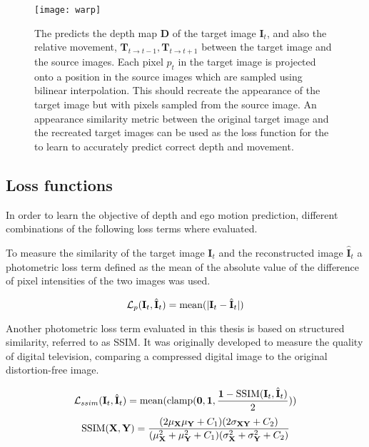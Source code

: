 \begin{figure}[H]
	\centering
	\texttt{[image: warp]}
	\caption{The \abbrCNN predicts the depth map $\textbf{D}$ of the target image $\textbf{I}_t$, and also the relative movement, $\textbf{T}_{t\rightarrow t-1}, \textbf{T}_{t\rightarrow t+1}$ between the target image and the source images. Each pixel $p_t$ in the target image is projected onto a position in the source images which are sampled using bilinear interpolation. This should recreate the appearance of the target image but with pixels sampled from the source image. An appearance similarity metric between the original target image and the recreated target images can be used as the loss function for the \abbrCNN to learn to accurately predict correct depth and movement.}
	\label{fig:warp}
\end{figure}



\subsection{Loss functions}
\label{sec:loss}

In order to learn the objective of depth and ego motion prediction, different combinations of the following loss terms where evaluated.

To measure the similarity of the target image $\textbf{I}_t$ and the reconstructed image $\hat{\textbf{I}}_t$ a photometric loss term defined as the mean of the absolute value of the difference of pixel intensities of the two images was used.

\begin{equation}
\mathcal{L}_p(\textbf{I}_t, \hat{\textbf{I}}_t)=\operatorname{mean}(|\textbf{I}_t - \hat{\textbf{I}}_t|)
\end{equation}

Another photometric loss term evaluated in this thesis is based on structured similarity, referred to as SSIM\cite{ssim}. It was originally developed to measure the quality of digital television, comparing a compressed digital image to the original distortion-free image.

\begin{equation}
\mathcal{L}_{ssim}(\textbf{I}_t, \hat{\textbf{I}}_t)=\operatorname{mean}(\operatorname{clamp}(\textbf{0},\textbf{1},\dfrac{\textbf{1}-\operatorname{SSIM}(\textbf{I}_t, \hat{\textbf{I}}_t)}{2}))
\end{equation}
\begin{equation}
\operatorname{SSIM}(\textbf{X},\textbf{Y})=\frac{(2\mu_{\textbf{X}}\mu_{\textbf{Y}}+C_1)(2\sigma_{\textbf{XY}}+C_2)}{(\mu_{\textbf{X}}^2+\mu_{\textbf{Y}}^2+C_1)(\sigma_{\textbf{X}}^2+\sigma_{\textbf{Y}}^2+C_2)}
\end{equation}

